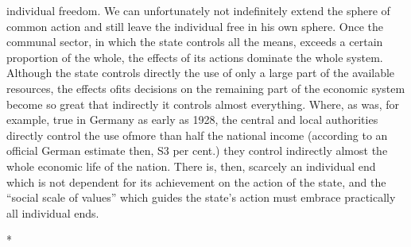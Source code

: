 \documentclass[11pt,openany]{book}
\begin{document}
individual freedom. We can unfortunately not indefinitely extend the sphere of common action and still leave the individual free in his own sphere. Once the communal sector, in which the state controls all the means, exceeds a certain proportion of the whole, the effects of its actions dominate the whole system. Although the state controls directly the use of only a large part of the available resources, the effects ofits decisions on the remaining part of the economic system become so great that indirectly it controls almost everything. Where, as was, for example, true in Germany as early as 1928, the central and local authorities directly control the use ofmore than half the national income (according to an official German estimate then, S3 per cent.) they control indirectly almost the whole economic life of the nation. There is, then, scarcely an individual end which is not dependent for its achievement on the action of the state, and the ``social scale of values'' which guides the state's action must embrace practically all individual ends.

\begin{center}\textasteriskcentered\hspace{0.9em}\textasteriskcentered\hspace{0.9em}\textasteriskcentered\end{center}

\begin{center}\textasteriskcentered\hspace{0.9em}\textasteriskcentered\hspace{0.9em}\textasteriskcentered\end{center}

\begin{center}\textasteriskcentered\hspace{0.9em}\textasteriskcentered\hspace{0.9em}\textasteriskcentered\end{center}

*
\end{document}
